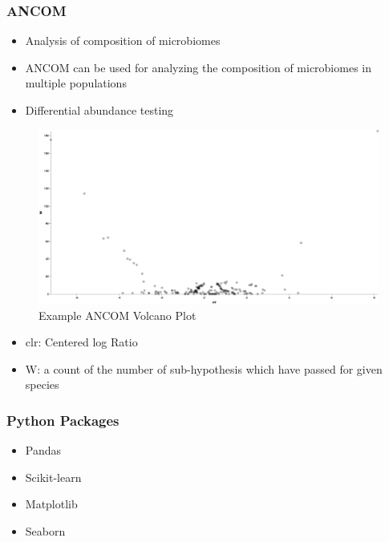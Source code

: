 \documentclass{beamer}
\begin{document}
    \begin{frame}
        \frametitle{ANCOM}

        \begin{itemize}
            \item Analysis of composition of microbiomes
            \item ANCOM can be used for analyzing the composition of microbiomes in multiple populations \cite{ANCOM1}
            \item Differential abundance testing
        \end{itemize}

        \begin{figure}
            \includegraphics[width=0.3 \linewidth]{figures/ANCOM/example.png}
            \caption{Example ANCOM Volcano Plot \protect\cite{qiime1, qiime2}}
        \end{figure}

        \begin{itemize}
            \item clr: Centered log Ratio
            \item W: a count of the number of sub-hypothesis which have passed for given species
        \end{itemize}
    \end{frame}

    \begin{frame}
        \frametitle{Python Packages}

        \begin{itemize}
            \item Pandas \cite{pandas1}
            \item Scikit-learn \cite{sklearn1}
            \item Matplotlib \cite{matplotlib1, matplotlib2}
            \item Seaborn \cite{seaborn1}
        \end{itemize}
    \end{frame}
\end{document}

